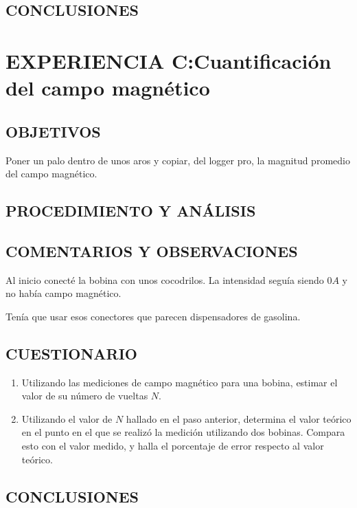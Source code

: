 \documentclass[10pt, twoside]{article}
\begin{document}
\subsection{CONCLUSIONES}%

\section{EXPERIENCIA C:Cuantificación del campo magnético}%

\subsection{OBJETIVOS}%

Poner un palo dentro de unos aros y copiar, del logger pro, la magnitud promedio
del campo magnético.

\subsection{PROCEDIMIENTO Y ANÁLISIS}%

\subsection{COMENTARIOS Y OBSERVACIONES}%

Al inicio conecté la bobina con unos cocodrilos.
La intensidad seguía siendo $0A$ y no había campo magnético.

Tenía que usar esos conectores que parecen dispensadores de gasolina.

\subsection{CUESTIONARIO}%
\begin{enumerate}[label=\roman*]
	\item Utilizando las mediciones de campo magnético para una bobina,
		estimar el valor de su número de vueltas $N$.
	\item Utilizando el valor de $N$ hallado en el paso anterior,
		determina el valor teórico en el punto en el que se realizó la medición
		utilizando dos bobinas.
		Compara esto con el valor medido,
		y halla el porcentaje de error respecto al valor teórico.
\end{enumerate}

\subsection{CONCLUSIONES}%
\end{document}
